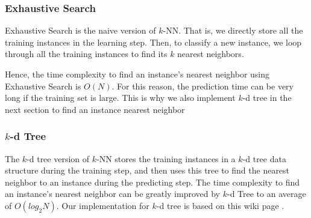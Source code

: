 \subsubsection{Exhaustive Search}
Exhaustive Search is the naive version of $k$-NN. That is, we directly store all the training instances in the learning step. Then, to classify a new instance, we loop through all the training instances to find its $k$ nearest neighbors.

 Hence, the time complexity to find an instance's nearest neighbor using Exhaustive Search is $O(N)$. For this reason, the prediction time can be very long if the training set is large. This is why we also implement $k$-d tree in the next section to find an instance nearest neighbor

\subsubsection{$k$-d Tree}
The $k$-d tree version of $k$-NN stores the training instances in a $k$-d tree data structure during the training step, and then uses this tree to find the nearest neighbor to an instance during the predicting step. The time complexity to find an instance's nearest neighbor can be greatly improved by $k$-d Tree to an average of $O(log_2N)$. Our implementation for $k$-d tree is based on this wiki page \cite{KDWiki}.